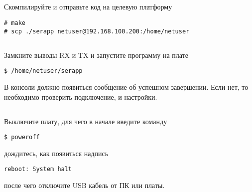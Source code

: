 \subsection{}Скомпилируйте и отправьте код на целевую платформу
\begin{lstlisting}[style=bash]
# make
# scp ./serapp netuser@192.168.100.200:/home/netuser
\end{lstlisting}

\subsection{}Замкните выводы RX и TX и запустите программу на плате
\begin{lstlisting}[style=bash]
$ /home/netuser/serapp
\end{lstlisting}
В консоли должно появиться сообщение об успешном завершении. Если нет, то необходимо проверить подключение, и настройки.

\subsection{} Выключите плату, для чего в начале введите команду
\begin{lstlisting}[style=bash]
	$ poweroff
\end{lstlisting}
дождитесь, как появиться надпись
\begin{lstlisting}[style=stdout]
	reboot: System halt
\end{lstlisting}
после чего отключите USB кабель от ПК или платы. 